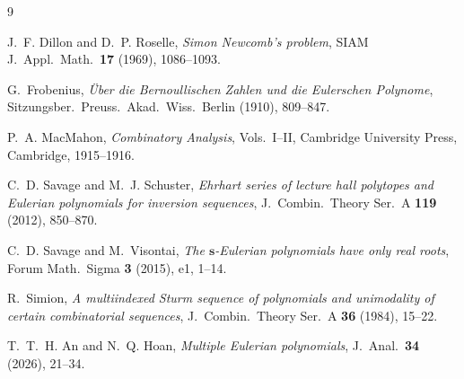\documentclass[11pt]{article}
\theoremstyle{definition}
\begin{document}
\begin{thebibliography}{9}

J.~F. Dillon and D.~P. Roselle,
\emph{Simon Newcomb's problem},
SIAM J.\ Appl.\ Math.\ \textbf{17} (1969), 1086--1093.

G.~Frobenius,
\emph{\"Uber die Bernoullischen Zahlen und die Eulerschen Polynome},
Sitzungsber.\ Preuss.\ Akad.\ Wiss.\ Berlin (1910), 809--847.

P.~A. MacMahon,
\emph{Combinatory Analysis}, Vols.~I--II,
Cambridge University Press, Cambridge, 1915--1916.

C.~D. Savage and M.~J. Schuster,
\emph{Ehrhart series of lecture hall polytopes and Eulerian polynomials for inversion sequences},
J.\ Combin.\ Theory Ser.\ A \textbf{119} (2012), 850--870.

C.~D. Savage and M.~Visontai,
\emph{The $\mathbf{s}$-Eulerian polynomials have only real roots},
Forum Math.\ Sigma \textbf{3} (2015), e1, 1--14.

R.~Simion,
\emph{A multiindexed Sturm sequence of polynomials and unimodality of certain combinatorial sequences},
J.\ Combin.\ Theory Ser.\ A \textbf{36} (1984), 15--22.

T.~T.~H. An and N.~Q. Hoan,
\emph{Multiple Eulerian polynomials},
J.\ Anal.\ \textbf{34} (2026), 21--34.

\end{thebibliography}
\end{document}
